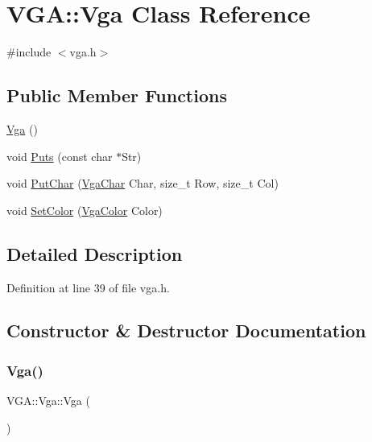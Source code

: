 \hypertarget{class_v_g_a_1_1_vga}{}\section{V\+GA\+:\+:Vga Class Reference}
\label{class_v_g_a_1_1_vga}


{\ttfamily \#include $<$vga.\+h$>$}

\subsection*{Public Member Functions}
\begin{DoxyCompactItemize}
\item 
\hyperlink{class_v_g_a_1_1_vga_a40f0b5de5a1687eca3c47738d8232bc7}{Vga} ()
\item 
void \hyperlink{class_v_g_a_1_1_vga_ad9977be41b05972a0366f8448b669a71}{Puts} (const char $\ast$Str)
\item 
void \hyperlink{class_v_g_a_1_1_vga_a29fa008c7c3c71535e0502063451bea7}{Put\+Char} (\hyperlink{namespace_v_g_a_adb876ce4a116e09f39708ca16ef25f74}{Vga\+Char} Char, size\+\_\+t Row, size\+\_\+t Col)
\item 
void \hyperlink{class_v_g_a_1_1_vga_af865dcb8b0e73497fa242601619f5570}{Set\+Color} (\hyperlink{namespace_v_g_a_afa3882cddefd08a3f33aaf6fcbcbcd7f}{Vga\+Color} Color)
\end{DoxyCompactItemize}


\subsection{Detailed Description}


Definition at line 39 of file vga.\+h.



\subsection{Constructor \& Destructor Documentation}
\mbox{\label{class_v_g_a_1_1_vga_a40f0b5de5a1687eca3c47738d8232bc7}} 
\subsubsection{\texorpdfstring{Vga()}{Vga()}}
{\footnotesize\ttfamily V\+G\+A\+::\+Vga\+::\+Vga (\begin{DoxyParamCaption}{ }\end{DoxyParamCaption})\hspace{0.3cm}{\ttfamily [inline]}}




